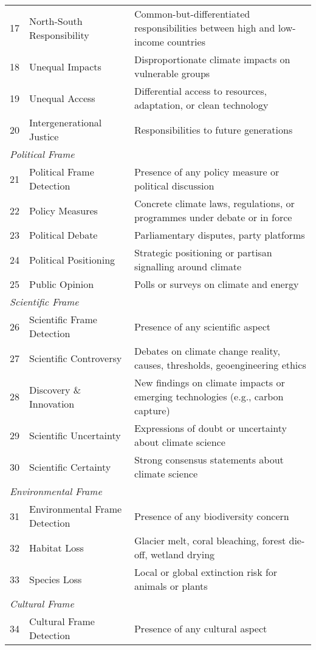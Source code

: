 \documentclass[12pt]{article}
\begin{document}
{\begin{longtable}{p{0.5cm}p{5cm}p{16cm}}
17 & North-South Responsibility & Common-but-differentiated responsibilities between high and low-income countries \\
18 & Unequal Impacts & Disproportionate climate impacts on vulnerable groups \\
19 & Unequal Access & Differential access to resources, adaptation, or clean technology \\
20 & Intergenerational Justice & Responsibilities to future generations \\
\midrule
\multicolumn{3}{l}{\textit{Political Frame}} \\
21 & Political Frame Detection & Presence of any policy measure or political discussion \\
22 & Policy Measures & Concrete climate laws, regulations, or programmes under debate or in force \\
23 & Political Debate & Parliamentary disputes, party platforms \\
24 & Political Positioning & Strategic positioning or partisan signalling around climate \\
25 & Public Opinion & Polls or surveys on climate and energy \\
\midrule
\multicolumn{3}{l}{\textit{Scientific Frame}} \\
26 & Scientific Frame Detection & Presence of any scientific aspect \\
27 & Scientific Controversy & Debates on climate change reality, causes, thresholds, geoengineering ethics \\
28 & Discovery \& Innovation & New findings on climate impacts or emerging technologies (e.g., carbon capture) \\
29 & Scientific Uncertainty & Expressions of doubt or uncertainty about climate science \\
30 & Scientific Certainty & Strong consensus statements about climate science \\
\midrule
\multicolumn{3}{l}{\textit{Environmental Frame}} \\
31 & Environmental Frame Detection & Presence of any biodiversity concern \\
32 & Habitat Loss & Glacier melt, coral bleaching, forest die-off, wetland drying \\
33 & Species Loss & Local or global extinction risk for animals or plants \\
\midrule
\multicolumn{3}{l}{\textit{Cultural Frame}} \\
34 & Cultural Frame Detection & Presence of any cultural aspect \\

\end{longtable}}
\end{document}
